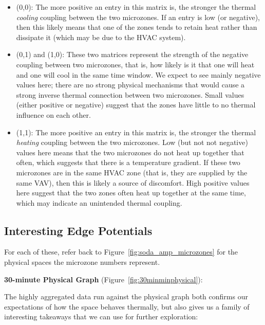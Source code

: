 \begin{itemize}[noitemsep,nolistsep]
\item (0,0): The more positive an entry in this matrix is, the stronger the thermal \emph{cooling} coupling between the two microzones.
If an entry is low (or negative), then this likely means that one of the zones tends to retain heat rather than dissipate it (which may be due to the HVAC system).
\item (0,1) and (1,0): These two matrices represent the strength of the negative coupling between two microzones, that is, how likely is it that one will heat and one will cool in the same time window.
We expect to see mainly negative values here; there are no strong physical mechanisms that would cause a strong inverse thermal connection between two microzones.
Small values (either positive or negative) suggest that the zones have little to no thermal influence on each other.
\item (1,1): The more positive an entry in this matrix is, the stronger the thermal \emph{heating} coupling between the two microzones.
Low (but not not negative) values here means that the two microzones do not heat up together that often, which suggests that there is a temperature gradient.
If these two microzones are in the same HVAC zone (that is, they are supplied by the same VAV), then this is likely a source of discomfort.
High positive values here suggest that the two zones often heat up together at the same time, which may indicate an unintended thermal coupling.
\end{itemize}

\subsection{Interesting Edge Potentials}

For each of these, refer back to Figure~\ref{fig:soda_amp_microzones} for the physical spaces the microzone numbers represent.

\textbf{30-minute Physical Graph} (Figure~\ref{fig:30minminphysical}):

The highly aggregated data run against the physical graph both confirms our expectations of how the space behaves thermally, but also gives us a family of interesting takeaways that we can use for further exploration:

